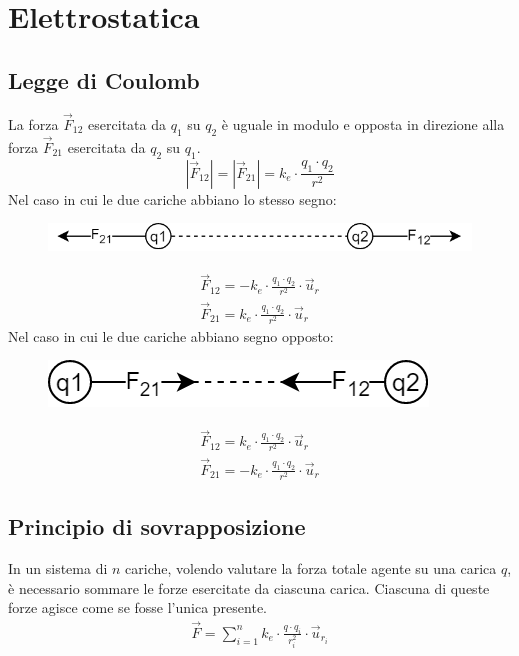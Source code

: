 \chapter{Elettrostatica}

\section{Legge di Coulomb}
  
La forza $\vec{F}_{12}$ esercitata da $q_1$ su $q_2$ è uguale in modulo e opposta in direzione alla forza $\vec{F}_{21}$ esercitata da $q_2$ su $q_1$.
    \begin{displaymath}
    	|\vec{F}_{12}| = |\vec{F}_{21}| = k_e \cdot \frac{q_1 \cdot q_2}{r^2}
    \end{displaymath}
Nel caso in cui le due cariche abbiano lo stesso segno:
	\begin{figure}[h!]
      \centering
      \includegraphics[scale=0.4]{Pictures/esempio1}
  \end{figure}
  	\begin{displaymath}\begin{aligned}
    	\vec{F}_{12} = - k_e \cdot \frac{q_1 \cdot q_2}{r^2} \cdot \vec{u}_r\\
        \vec{F}_{21} = k_e \cdot \frac{q_1 \cdot q_2}{r^2} \cdot \vec{u}_r
    \end{aligned}\end{displaymath}
Nel caso in cui le due cariche abbiano segno opposto:
    \begin{figure}[h!]
    	\centering
        \includegraphics[scale=0.4]{Pictures/esempio2.png}
	\end{figure}
    \begin{displaymath}\begin{aligned}
        \vec{F}_{12} = k_e \cdot \frac{q_1 \cdot q_2}{r^2} \cdot \vec{u}_r\\
        \vec{F}_{21} = - k_e \cdot \frac{q_1 \cdot q_2}{r^2} \cdot \vec{u}_r
    \end{aligned}\end{displaymath}
    
\section{Principio di sovrapposizione}
In un sistema di $n$ cariche, volendo valutare la forza totale agente su una carica $q$, è necessario sommare le forze esercitate da ciascuna carica. Ciascuna di queste forze agisce come se fosse l'unica presente.
	\begin{displaymath}\begin{aligned}
		\vec{F} = \sum_{i=1}^n k_e \cdot \frac{q \cdot q_i}{r_i^2} \cdot \vec{u}_{r_i}
	\end{aligned}\end{displaymath}

